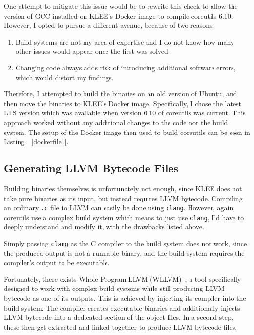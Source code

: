 \documentclass{article}
\let\savedCite=\cite
\renewcommand{\cite}{\unskip~\savedCite}
\let\savedRef=\ref
\renewcommand{\ref}{\unskip~\savedRef}
\begin{document}
One attempt to mitigate this issue would be to rewrite this check to allow the version of GCC installed on KLEE's Docker image to compile coreutils 6.10. However, I opted to pursue a different avenue, because of two reasons:
\begin{enumerate}
    \item Build systems are not my area of expertise and I do not know how many other issues would appear once the first was solved.
    \item Changing code always adds risk of introducing additional software errors, which would distort my findings.
\end{enumerate}

Therefore, I attempted to build the binaries on an old version of Ubuntu, and then move the binaries to KLEE's Docker image. Specifically, I chose the latest LTS version which was available when version 6.10 of coreutils was current. This approach worked without any additional changes to the code nor the build system. The setup of the Docker image then used to build coreutils can be seen in Listing~\ref{dockerfile1}.



\subsection{Generating LLVM Bytecode Files}
\label{LLVM}

Building binaries themselves is unfortunately not enough, since KLEE does not take pure binaries as its input, but instead requires LLVM bytecode. Compiling an ordinary \lstinline{.c} file to LLVM can easily be done using \lstinline{clang}. However, again, coreutils use a complex build system which means to just use \lstinline{clang}, I'd have to deeply understand and modify it, with the drawbacks listed above.

Simply passing \lstinline{clang} as the C compiler to the build system does not work, since the produced output is not a runnable binary, and the build system requires the compiler's output to be executable.

Fortunately, there exists Whole Program LLVM (WLLVM)\cite{WLLVM}, a tool specifically designed to work with complex build systems while still producing LLVM bytecode as one of its outputs. This is achieved by injecting its compiler into the build system. The compiler creates executable binaries and additionally injects LLVM bytecode into a dedicated section of the object files. In a second step, these then get extracted and linked together to produce LLVM bytecode files.
\end{document}
